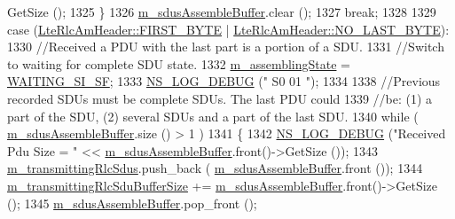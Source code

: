 \begin{DoxyCode}
      GetSize ();
1325                                 \}
1326                               \hyperlink{classns3_1_1LteRlcAm_a075262ee7d8d49e97ab0c48b5e763bf1}{m\_sdusAssembleBuffer}.clear ();
1327                       \textcolor{keywordflow}{break};
1328                       
1329                       \textcolor{keywordflow}{case} (\hyperlink{classns3_1_1LteRlcAmHeader_af42d22f1202bd0d8fa1f4cd0494b8b29a3b7a1fc289b74db76f2e76194d289a24}{LteRlcAmHeader::FIRST\_BYTE} | 
      \hyperlink{classns3_1_1LteRlcAmHeader_af0fb4ccf208128c7cf9dcabf02593749af3f3cbb1727324b59b486aa955ce28f8}{LteRlcAmHeader::NO\_LAST\_BYTE}):
1330                               \textcolor{comment}{//Received a PDU with the last part is a portion of a SDU.}
1331                               \textcolor{comment}{//Switch to waiting for complete SDU state.}
1332                               \hyperlink{classns3_1_1LteRlcAm_ab6d2954b419df60fc8f8df012fa2709c}{m\_assemblingState} = \hyperlink{classns3_1_1LteRlcAm_a43eeebdccf778e2247c956481ed03d62a967f9c81a213f824b6a908bdfc1a7e4e}{WAITING\_SI\_SF};
1333                               \hyperlink{group__logging_ga413f1886406d49f59a6a0a89b77b4d0a}{NS\_LOG\_DEBUG} (\textcolor{stringliteral}{" S0 01 "});
1334 
1338                               \textcolor{comment}{//Previous recorded SDUs must be complete SDUs. The last PDU could }
1339                               \textcolor{comment}{//be: (1) a part of the SDU, (2) several SDUs and a part of the last SDU.}
1340                               \textcolor{keywordflow}{while} ( \hyperlink{classns3_1_1LteRlcAm_a075262ee7d8d49e97ab0c48b5e763bf1}{m\_sdusAssembleBuffer}.size () > 1 )
1341                                 \{
1342                                   \hyperlink{group__logging_ga413f1886406d49f59a6a0a89b77b4d0a}{NS\_LOG\_DEBUG} (\textcolor{stringliteral}{"Received Pdu Size = "} << 
      \hyperlink{classns3_1_1LteRlcAm_a075262ee7d8d49e97ab0c48b5e763bf1}{m\_sdusAssembleBuffer}.front()->GetSize ());
1343                                   \hyperlink{classns3_1_1LteRlcAm_a941fac42e27a28f35b0eea1a02c0595f}{m\_transmittingRlcSdus}.push\_back (
      \hyperlink{classns3_1_1LteRlcAm_a075262ee7d8d49e97ab0c48b5e763bf1}{m\_sdusAssembleBuffer}.front ());
1344                                   \hyperlink{classns3_1_1LteRlcAm_a27351db62caae50aabc6b23636a5e0dc}{m\_transmittingRlcSduBufferSize} += 
      \hyperlink{classns3_1_1LteRlcAm_a075262ee7d8d49e97ab0c48b5e763bf1}{m\_sdusAssembleBuffer}.front()->GetSize ();
1345                                   \hyperlink{classns3_1_1LteRlcAm_a075262ee7d8d49e97ab0c48b5e763bf1}{m\_sdusAssembleBuffer}.pop\_front ();

\end{DoxyCode}
